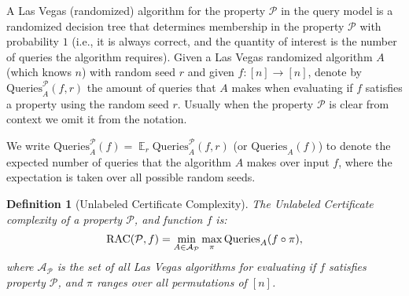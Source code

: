 \documentclass[11pt]{article}
\numberwithin{equation}{section}
\newtheorem{definition}[definition]{Definition}
\newcommand\E{\mathop{\mathbb E}}
\newcommand{\Query}{\text{Queries}}
\renewcommand{\P}{\mathcal{P}}
\newcommand{\1}{\mathbf{1}}
\newcommand{\A}{\mathcal A}
\begin{document}
A Las Vegas (randomized) algorithm for the property $\mathcal{P}$ in the query model is a randomized decision tree that determines membership in the property $\P$ with probability $1$ (i.e., it is always correct, and the quantity of interest is the number of queries the algorithm requires).
Given a Las Vegas randomized algorithm $A$ (which knows $n$) with random seed $r$ and given $f \colon [n] \to [n]$,
denote by $\Query^\P_A(f,r)$ the amount of queries that $A$ makes when evaluating if $f$ satisfies a property using the random seed $r$. Usually when the property $\mathcal{P}$ is clear from context we omit it from the notation.

We write $\Query^\P_A(f) = \E_{r} \Query^\P_A(f,r)$ (or $\Query_A(f)$) to denote the expected number of queries that the algorithm $A$ makes over input $f$, where the expectation is taken over all possible random seeds.


\begin{definition}[Unlabeled Certificate Complexity]
  The \emph{Unlabeled Certificate} complexity of a property $\P$, and function $f$ is:
\begin{align*}
    \RACC(\P, f) =  \min_{A \in \A_\P} \max_{\pi} 
    \Query_A(f \circ \pi),
\end{align*}
where $\A_{\P}$ is the set of all Las Vegas algorithms for evaluating if $f$ satisfies property $\P$, and $\pi$ ranges over all permutations of $[n]$.
\end{definition}
\end{document}
